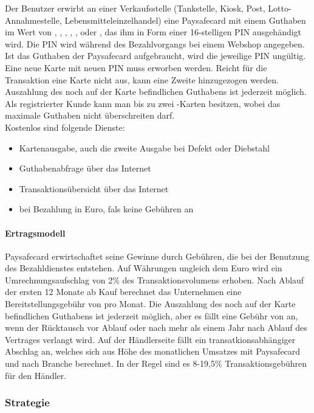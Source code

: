 Der Benutzer erwirbt an einer Verkaufsstelle (Tankstelle, Kiosk, Post, Lotto-Annahmestelle, Lebensmitteleinzelhandel) eine Paysafecard mit einem Guthaben im Wert von , , , , ,  oder , das ihm in Form einer 16-stelligen PIN ausgehändigt wird. Die PIN wird während des Bezahlvorgangs bei einem Webshop angegeben. Ist das Guthaben der Paysafecard aufgebraucht, wird die jeweilige PIN ungültig. Eine neue Karte mit neuen PIN muss erworben werden. Reicht für die Transaktion eine Karte nicht aus, kann eine Zweite hinzugezogen werden. Auszahlung des noch auf der Karte befindlichen Guthabens ist jederzeit möglich. 
Als registrierter Kunde kann man bis zu zwei -Karten besitzen, wobei das maximale Guthaben nicht  überschreiten darf.
\\
Kostenlos sind folgende Dienste: 
\begin{itemize}
	\item   Kartenausgabe, auch die zweite Ausgabe bei Defekt oder Diebstahl
    \item   Guthabenabfrage über das Internet
    \item   Transaktionsübersicht über das Internet
    \item   bei Bezahlung in Euro, fals keine Gebühren an
\end{itemize}


\paragraph{Ertragsmodell}

Paysafecard erwirtschaftet seine Gewinne durch Gebühren, die bei der Benutzung des Bezahldienstes entstehen. Auf Währungen un\-gleich dem Euro wird ein Umrechnungsaufschlag von 2\% des Transaktions\-vo\-lumens erhoben. Nach Ablauf der ersten 12 Monate ab Kauf berechnet das Unternehmen eine Bereitstellungsgebühr von  pro Monat. Die Auszahlung des noch auf der Karte befindlichen Guthabens ist jederzeit möglich, aber es fällt eine Gebühr von  an, wenn der Rücktausch vor Ablauf oder nach mehr als einem Jahr nach Ablauf des Vertrages verlangt wird. Auf der Händlerseite fällt ein transatkionsabhängiger Abschlag an, welches sich aus Höhe des monatlichen Umsatzes mit Paysafecard und nach Branche berechnet. In der Regel sind es 8-19,5\% Transaktionsgebühren für den Händler.



\subsubsection{Strategie}

